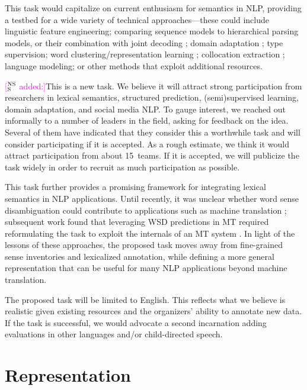 \documentclass[11pt]{article}
\newcommand{\ensuretext}[1]{#1}
\newcommand{\nssmarker}{\ensuretext{\textcolor{magenta}{\ensuremath{^{\textsc{NS}}_{\textsc{S}}}}}}
\newcommand{\arkcomment}[3]{\ensuretext{\textcolor{#3}{[#1 #2]}}}
\newcommand{\nss}[1]{\arkcomment{\nssmarker}{#1}{magenta}}
\begin{document}
This task would capitalize on current enthusiasm for semantics in NLP, 
providing a testbed for a wide variety of technical approaches---these could include 
linguistic feature engineering; comparing sequence models to hierarchical parsing models, or their combination 
with joint decoding \citep{le_roux-14}; domain adaptation \citep{johannsen-14}; 
type supervision; word clustering\slash representation learning \citep{grave-13}; 
collocation extraction \citep{pecina-10,ramisch-12}; 
language modeling; or other methods that exploit additional resources.

\nss{added:}This is a new task. 
We believe it will attract strong participation from researchers in lexical semantics, 
structured prediction, (semi)supervised learning, domain adaptation, and social media NLP. 
To gauge interest, we reached out informally to a number of leaders in the field, 
asking for feedback on the idea. Several of them have indicated that they consider this 
a worthwhile task and will consider participating if it is accepted.
As a rough estimate, we think it would attract participation from about 15~teams.
If it is accepted, we will publicize the task widely in order to recruit as much participation as possible.

This task further provides a promising framework for integrating lexical semantics in NLP applications. 
Until recently, it was unclear whether word sense disambiguation could contribute to applications 
such as machine translation \citep{carpuat-05,resnik-06}; 
subsequent work found that leveraging WSD predictions in MT required 
reformulating the task to exploit the internals of an MT system
\citep{chan-07,carpuat-07,lefever-10}. 
In light of the lessons of these approaches, the proposed task moves away 
from fine-grained sense inventories and lexicalized annotation, 
while defining a more general representation that can be useful 
for many NLP applications beyond machine translation.


The proposed task will be limited to English. 
This reflects what we believe is realistic given existing resources 
and the organizers' ability to annotate new data. 
If the task is successful, we would advocate a second incarnation 
adding evaluations in other languages and/or child-directed speech.

\section{Representation}
\end{document}
